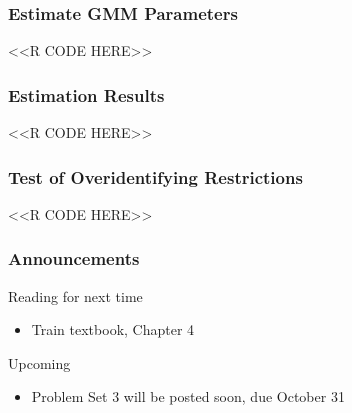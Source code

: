 \documentclass{beamer}
\begin{document}
\begin{frame}[fragile]\frametitle{Estimate GMM Parameters}
    <<R CODE HERE>>
\end{frame}

\begin{frame}[fragile]\frametitle{Estimation Results}
    <<R CODE HERE>>
\end{frame}

\begin{frame}[fragile]\frametitle{Test of Overidentifying Restrictions}
    <<R CODE HERE>>
\end{frame}

\begin{frame}\frametitle{Announcements}
    Reading for next time
    \begin{itemize}
        \item Train textbook, Chapter 4
    \end{itemize}
    \vspace{3ex}
    Upcoming
    \begin{itemize}
        \item Problem Set 3 will be posted soon, due October 31
    \end{itemize}
\end{frame}
\end{document}
